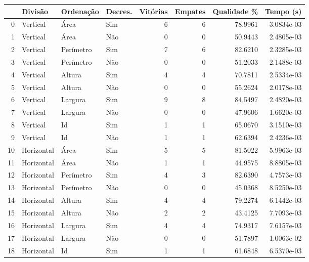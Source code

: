 \begin{tabular}{rlllrrrr}
\hline
& Divisão     & Ordenação & Decres. & Vitórias & Empates & Qualidade \% & Tempo (s)  \\
\hline
0  & Vertical    & Área      & Sim     & 6        & 6       & 78.9961      & 3.0834e-03 \\
1  & Vertical    & Área      & Não     & 0        & 0       & 50.9443      & 2.4805e-03 \\
2  & Vertical    & Perímetro & Sim     & 7        & 6       & 82.6210      & 2.3285e-03 \\
3  & Vertical    & Perímetro & Não     & 0        & 0       & 51.2033      & 2.1488e-03 \\
4  & Vertical    & Altura    & Sim     & 4        & 4       & 70.7811      & 2.5334e-03 \\
5  & Vertical    & Altura    & Não     & 0        & 0       & 55.2624      & 2.0178e-03 \\
6  & Vertical    & Largura   & Sim     & 9        & 8       & 84.5497      & 2.4820e-03 \\
7  & Vertical    & Largura   & Não     & 0        & 0       & 47.9606      & 1.6620e-03 \\
8  & Vertical    & Id        & Sim     & 1        & 1       & 65.0670      & 3.1510e-03 \\
9  & Vertical    & Id        & Não     & 1        & 1       & 62.6394      & 2.4236e-03 \\
10 & Horizontal  & Área      & Sim     & 5        & 5       & 81.5022      & 5.9963e-03 \\
11 & Horizontal  & Área      & Não     & 1        & 1       & 44.9575      & 8.8805e-03 \\
12 & Horizontal  & Perímetro & Sim     & 4        & 3       & 82.6390      & 4.7573e-03 \\
13 & Horizontal  & Perímetro & Não     & 0        & 0       & 45.0368      & 8.5250e-03 \\
14 & Horizontal  & Altura    & Sim     & 4        & 4       & 79.2274      & 6.1442e-03 \\
15 & Horizontal  & Altura    & Não     & 2        & 2       & 43.4125      & 7.7093e-03 \\
16 & Horizontal  & Largura   & Sim     & 4        & 4       & 74.9317      & 7.6157e-03 \\
17 & Horizontal  & Largura   & Não     & 0        & 0       & 51.7897      & 1.0063e-02 \\
18 & Horizontal  & Id        & Sim     & 1        & 1       & 61.6848      & 6.5370e-03 \\

\end{tabular}
